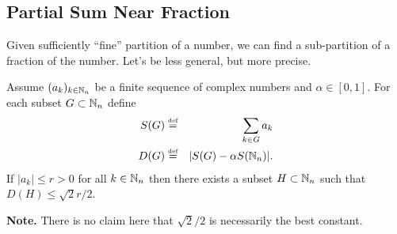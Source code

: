 \subsection{Partial Sum Near Fraction}

Given sufficiently ``fine'' partition of a number,
we can find a sub-partition of a fraction of the number.
Let's be less general, but more precise.
\begin{llem} \label{lem:near:frac}
Assume \((a_k)_{k\in{\ensuremath{\mathbb{N}}_n}}\) be a finite sequence of complex numbers
and \(\alpha\in[0,1]\).
For each subset \(G\subset \mathbb{N}_n\) define
\begin{eqnarray*}
S(G) &\stackrel{\mbox{\upshape\tiny def}}{=}& \sum_{k\in G} a_k \\
D(G) &\stackrel{\mbox{\upshape\tiny def}}{=}& |S(G) - \alpha S(\mathbb{N}_n)|.
\end{eqnarray*}
If \(|a_k| \leq r > 0\) for all \(k\in \mathbb{N}_n\)
then there exists a subset \(H \subset \mathbb{N}_n\)
such that \(D(H) \leq \sqrt{2}r/2\).
\end{llem}
\textbf{Note.} There is no claim here
that \(\sqrt{2}/2\) is necessarily the best constant.
\newline
